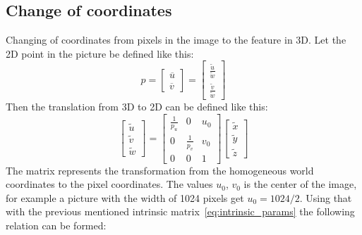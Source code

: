 \subsection{Change of coordinates}%
\label{sub:motod:changeofocd}
Changing of coordinates from pixels in the image to the feature in 3D.
Let the 2D point in the picture be defined like this:
\begin{equation}
    p=\begin{bmatrix}
        \overline{u}\\ \overline{v}
    \end{bmatrix}
    = \begin{bmatrix}
        \frac{\tilde u}{\tilde w}\\
        \frac{\tilde v}{\tilde w}
    \end{bmatrix}
\end{equation}
Then the translation from 3D to 2D can be defined like this:
\begin{equation}
    \begin{bmatrix}
        \tilde u \\ \tilde v \\ \tilde w
    \end{bmatrix}
    =
    \begin{bmatrix}
        \frac{1}{p_u} & 0 & u_0\\
        0 & \frac{1}{p_v} & v_0\\
        0 & 0 & 1
    \end{bmatrix}
    \begin{bmatrix}
        \tilde x\\ \tilde y\\ \tilde z
    \end{bmatrix}
\end{equation}
The matrix represents the transformation from the homogeneous world coordinates to the pixel coordinates.
The values $u_0$, $v_0$ is the center of the image, for example a picture with the width of 1024 pixels get $u_0 = 1024/2$.
Using that with the previous mentioned intrinsic matrix~\ref{eq:intrinsic_params} the following relation can be formed:

